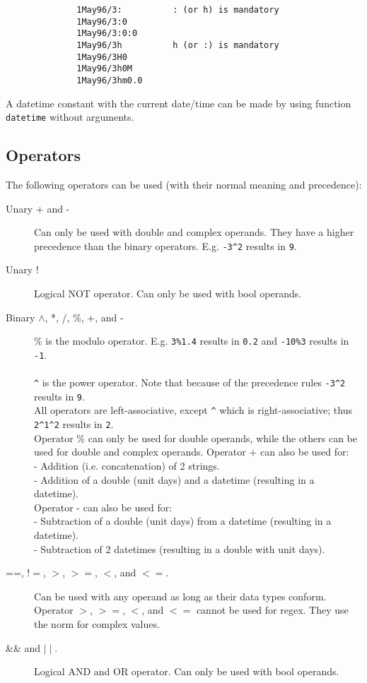 \begin{itemize}
\begin{enumerate}
\begin{verbatim}
              1May96/3:          : (or h) is mandatory
              1May96/3:0
              1May96/3:0:0
              1May96/3h          h (or :) is mandatory
              1May96/3H0
              1May96/3h0M
              1May96/3hm0.0
              \end{verbatim}
              A datetime constant with the current date/time can be made
              by using function \texttt{datetime} without arguments.
       \end{enumerate}
\end{itemize}

\label{TAQL:OPERATORS}
\subsection{Operators}
The following operators can be used (with their normal meaning and precedence):
\begin{description}
  \item[ Unary + and -]
       Can only be used with double and complex operands.
       They have a higher precedence than the binary operators.
       E.g. \texttt{-3}\verb+^+\texttt{2} results in \texttt{9}.
  \item[ Unary ! ]
       Logical NOT operator.
       Can only be used with bool operands.
  \item[ Binary $\wedge$, *, /, \%, +, and -] 
      \% is the modulo operator.
       E.g. \texttt{3\%1.4} results in \texttt{0.2} and
       \texttt{-10\%3} results in \texttt{-1}.
       \\\\\verb+^+ is the power operator.
       Note that because of the precedence rules
       \texttt{-3}\verb+^+\texttt{2} results in \texttt{9}.
       \\All operators are left-associative, except \verb+^+ which is
       right-associative; thus \texttt{2}\verb+^+\texttt{1}\verb+^+\texttt{2} results in \texttt{2}.
       \\Operator \% can only be used for double operands, while the others
       can be used for double and complex operands.
       Operator + can also be used for:
       \\- Addition (i.e. concatenation) of 2 strings.
       \\- Addition of a double (unit days) and a datetime
       (resulting in a datetime).
       \\Operator - can also be used for:
       \\- Subtraction of a double (unit days) from a datetime
       (resulting in a datetime).
       \\- Subtraction of 2 datetimes (resulting in a double with unit days).
  \item[ ==, $!=$, $>$, $>=$, $<$, and $<=$. ]
       Can be used with any operand as long as their data types conform.
       Operator $>$, $>=$, $<$, and $<=$ cannot be used for regex.
       They use the norm for complex values.
  \item[ \&\& and $\mid\mid$.]
       Logical AND and OR operator.
       Can only be used with bool operands.
\end{description}
